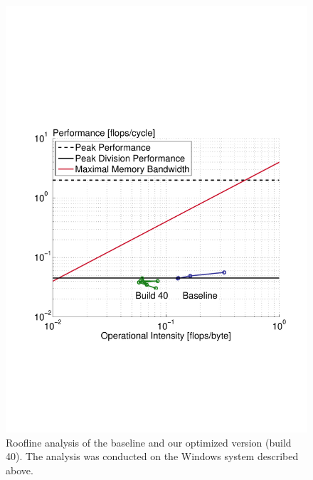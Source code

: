 \begin{figure}\centering
    \includegraphics[scale=0.47, trim={1.9cm 6cm 1.1cm 8.5cm},clip]{graphics/roofline_mixed.pdf}
  \caption{Roofline analysis of the baseline and our optimized version (build 40). The analysis was conducted on the Windows system described above.\label{roofline-mixed}}
\end{figure}

